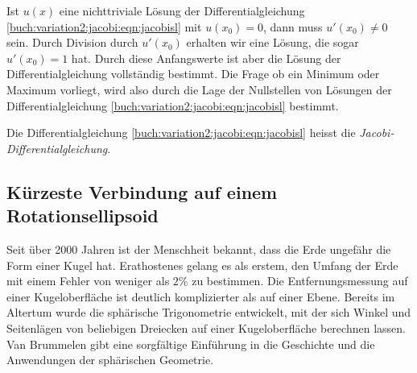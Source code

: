 Ist $u(x)$ eine nichttriviale Lösung der Differentialgleichung
\eqref{buch:variation2:jacobi:eqn:jacobisl} mit $u(x_0)=0$,
dann muss $u'(x_0)\ne 0$ sein.
Durch Division durch $u'(x_0)$ erhalten wir eine Lösung, die
sogar $u'(x_0)=1$ hat.
Durch diese Anfangswerte ist aber die Lösung der Differentialgleichung
vollständig bestimmt.
Die Frage ob ein Minimum oder Maximum vorliegt, wird also
durch die Lage der Nullstellen von Lösungen der Differentialgleichung
\eqref{buch:variation2:jacobi:eqn:jacobisl} bestimmt.

\begin{definition}
Die Differentialgleichung
\eqref{buch:variation2:jacobi:eqn:jacobisl}
heisst die {\em Jacobi-Differentialgleichung}.
\end{definition}



%
%
\subsection{Kürzeste Verbindung auf einem Rotationsellipsoid}
Seit über 2000 Jahren ist der Menschheit bekannt, dass die Erde
ungefähr die Form einer Kugel hat.
Erathostenes gelang es als erstem, den Umfang der Erde mit
einem Fehler von weniger als $2\%$ zu bestimmen.
Die Entfernungsmessung auf einer Kugeloberfläche ist deutlich
komplizierter als auf einer Ebene.
Bereits im Altertum wurde die sphärische Trigonometrie entwickelt,
mit der sich Winkel und Seitenlägen von beliebigen Dreiecken auf
einer Kugeloberfläche berechnen lassen.
Van Brummelen \cite{buch:heavenly} gibt eine sorgfältige Einführung
in die Geschichte und die Anwendungen der sphärischen Geometrie.

